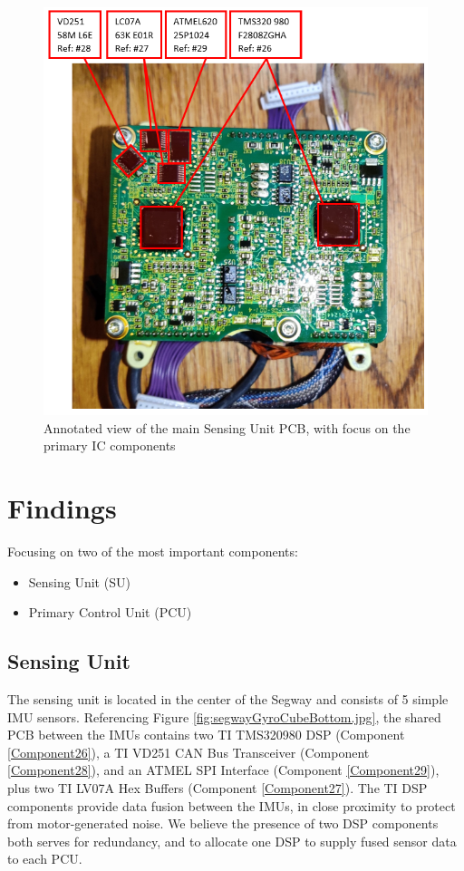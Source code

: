 \documentclass[]{formalLabReport}
\begin{document}
\begin{figure}
    \includegraphics[]{annotatedGyroCubeBottom.png}
    \caption{Annotated view of the main Sensing Unit PCB, with focus on the primary IC components}
    \label{fig:annotatedGyroCubeBottom.jpg}
\end{figure}

\section{Findings}
Focusing on two of the most important components:
\begin{itemize}
    \item Sensing Unit (SU)
    \item Primary Control Unit (PCU)
\end{itemize}

\subsection{Sensing Unit}
The sensing unit is located in the center of the Segway and consists of 5 simple IMU sensors. Referencing Figure \underline{\ref{fig:segwayGyroCubeBottom.jpg}}, the shared PCB between the IMUs contains two TI TMS320980 DSP (Component \underline{\ref{Component26}}), a TI VD251 CAN Bus Transceiver (Component \underline{\ref{Component28}}), and an ATMEL SPI Interface (Component \underline{\ref{Component29}}), plus two TI LV07A Hex Buffers (Component \underline{\ref{Component27}}). The TI DSP components provide data fusion between the IMUs, in close proximity to protect from motor-generated noise. We believe the presence of two DSP components both serves for redundancy, and to allocate one DSP to supply fused sensor data to each PCU.
\end{document}
